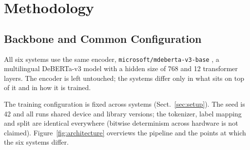 \section{Methodology}
\label{sec:method}

\subsection{Backbone and Common Configuration}
All six systems use the same encoder, \texttt{microsoft/mdeberta-v3-base}
\cite{he2023debertav3,liu2024mdeberta}, a multilingual DeBERTa-v3 model with a
hidden size of 768 and 12 transformer layers.  The encoder is left untouched;
the systems differ only in what sits on top of it and in how it is trained.

The training configuration is fixed across systems (Sect.~\ref{sec:setup}).
The seed is 42 and all runs shared device and library versions; the tokenizer,
label mapping and split are identical everywhere (bitwise determinism across
hardware is not claimed).  Figure~\ref{fig:architecture} overviews the pipeline and
the points at which the six systems differ.

